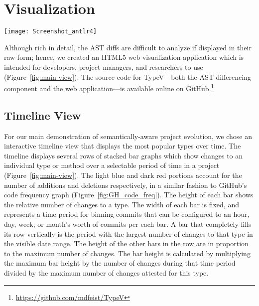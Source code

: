 \section{Visualization}



\label{sec:viz}

\begin{figure*}[tb]
\centering
\texttt{[image: Screenshot\_antlr4]}
\caption{Screenshot showing the main view for TypeV. The data being displayed is from the ANTLR4 repository. Light blue bars \additionsbox{10pt} indicate \textbf{additions}; dark red bars \deletionsbox{10pt} indicate \textbf{deletions}.}
\label{fig:main-view}
\end{figure*}

Although rich in detail, the AST diffs are difficult to analyze if displayed in their raw form; hence, we created an HTML5 web visualization application which is intended for developers, project managers, and researchers to use (Figure~\ref{fig:main-view}). The source code for TypeV---both the AST differencing component and the web application---is available online on GitHub.\footnote{\url{https://github.com/mdfeist/TypeV}}

\subsection{Timeline View}
For our main demonstration of semantically-aware project evolution, we chose an interactive timeline view that displays the most popular types over time. The timeline displays several rows of stacked bar graphs which show changes to an individual type or method over a selectable period of time in a project (Figure~\ref{fig:main-view}). The light blue \additionsbox{10pt} and dark red \deletionsbox{10pt} portions account for the number of additions and deletions respectively, in a similar fashion to GitHub's code frequency graph (Figure~\ref{fig:GH_code_freq}). The height of each bar shows the relative number of changes to a type. The width of each bar is fixed, and represents a time period for binning commits that can be configured to an hour, day, week, or month's worth of commits per each bar. A bar that completely fills its row vertically is the period with the largest number of changes to that type in the visible date range. The height of the other bars in the row are in proportion to the maximum number of changes. The bar height is calculated by multiplying the maximum bar height by the number of changes during that time period divided by the maximum number of changes attested for this type.

